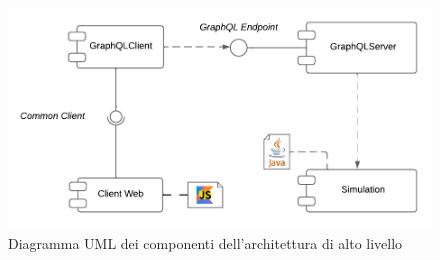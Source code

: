 \begin{figure}[htb]
	\centering
	\includegraphics[width=.8\linewidth]{imgs/domain_model.pdf}
	\caption{Diagramma UML dei componenti dell’architettura di alto livello}
	\label{fig:domain-model}
\end{figure}



